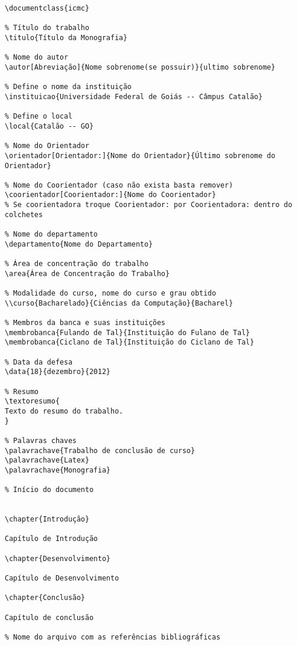 \lstset{language=Tex, breaklines=true}
\begin{lstlisting}[frame=single]
% Documento utilizando a classe ufgcac
\documentclass{icmc}

% Título do trabalho
\titulo{Título da Monografia}

% Nome do autor
\autor[Abreviação]{Nome sobrenome(se possuir)}{ultimo sobrenome}

% Define o nome da instituição
\instituicao{Universidade Federal de Goiás -- Câmpus Catalão}

% Define o local
\local{Catalão -- GO}

% Nome do Orientador
\orientador[Orientador:]{Nome do Orientador}{Último sobrenome do Orientador}

% Nome do Coorientador (caso não exista basta remover)
\coorientador[Coorientador:]{Nome do Coorientador}
% Se coorientadora troque Coorientador: por Coorientadora: dentro do colchetes

% Nome do departamento
\departamento{Nome do Departamento}

% Área de concentração do trabalho
\area{Área de Concentração do Trabalho}

% Modalidade do curso, nome do curso e grau obtido
\\curso{Bacharelado}{Ciências da Computação}{Bacharel}

% Membros da banca e suas instituições
\membrobanca{Fulando de Tal}{Instituição do Fulano de Tal}
\membrobanca{Ciclano de Tal}{Instituição do Ciclano de Tal}

% Data da defesa
\data{18}{dezembro}{2012}

% Resumo
\textoresumo{
Texto do resumo do trabalho.
}

% Palavras chaves
\palavrachave{Trabalho de conclusão de curso}
\palavrachave{Latex}
\palavrachave{Monografia}

% Início do documento


\chapter{Introdução}

Capítulo de Introdução

\chapter{Desenvolvimento}

Capítulo de Desenvolvimento

\chapter{Conclusão}

Capítulo de conclusão

% Nome do arquivo com as referências bibliográficas



\end{lstlisting}